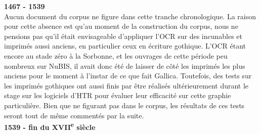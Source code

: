 \documentclass[a4paper,12pt,twoside]{book}
\begin{document}
	\textbf{1467 - 1539} \\
	
	Aucun document du corpus ne figure dans cette tranche chronologique. La raison pour cette absence est qu'au moment de la construction du corpus, nous ne pensions pas qu'il était envisageable d'appliquer l'OCR sur des incunables et imprimés aussi anciens, en particulier ceux en écriture gothique. L'OCR étant encore au stade zéro à la Sorbonne, et les ouvrages de cette période peu nombreux sur NuBIS, il avait donc été de laisser de côté les imprimés les plus anciens pour le moment à l'instar de ce que fait Gallica. Toutefois, des tests sur les imprimés gothiques ont aussi finis par être réalisés ultérieurement durant le stage sur les logiciels d'HTR pour évaluer leur efficacité sur cette graphie particulière. Bien que ne figurant pas dans le corpus, les résultats de ces tests seront tout de même commentés par la suite. \\
	
	\textbf{1539 - fin du XVII\textsuperscript{e} siècle} \\
	
\end{document}
